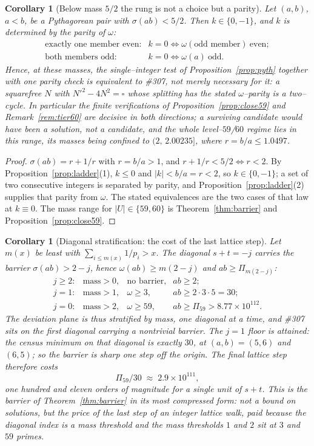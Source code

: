 \documentclass[11pt]{article}
\newtheorem{corollary}[theorem]{Corollary}
\theoremstyle{definition}
\begin{document}
\begin{corollary}[Below mass $5/2$ the rung is not a choice but a parity]\label{cor:kdetermined}
Let $(a,b)$, $a<b$, be a Pythagorean pair with $\sigma(ab)<5/2$. Then $k\in\{0,-1\}$, and $k$ is
\emph{determined} by the parity of $\omega$:
\[
\begin{array}{ll}
\text{exactly one member even:} & k=0\iff\omega(\text{odd member})\ \text{even};\\
\text{both members odd:}        & k=0\iff\omega(a)\ \text{odd}.
\end{array}
\]
Hence, at these masses, the single--integer test of Proposition~\ref{prop:pyth} together with one
parity check is \emph{equivalent} to \#307, not merely necessary for it: a squarefree $N$ with
$N'^2-4N^2=\square$ whose splitting has the stated $\omega$--parity \emph{is} a two--cycle. In
particular the finite verifications of Proposition~\ref{prop:close59} and Remark~\ref{rem:tier60} are
decisive in both directions; a surviving candidate would have been a solution, not a candidate,
and the whole level--$59$/$60$ regime lies in this range, its masses being confined to
$(2,\,2.00235]$, where $r=b/a\le1.0497$.
\end{corollary}
\begin{proof}
$\sigma(ab)=r+1/r$ with $r=b/a>1$, and $r+1/r<5/2\iff r<2$. By
Proposition~\ref{prop:ladder}(1), $k\le0$ and $|k|<b/a=r<2$, so $k\in\{0,-1\}$; a set of two
consecutive integers is separated by parity, and Proposition~\ref{prop:ladder}(2) supplies that
parity from $\omega$. The stated equivalences are the two cases of that law at $k\equiv0$. The
mass range for $|U|\in\{59,60\}$ is Theorem~\ref{thm:barrier} and Proposition~\ref{prop:close59}.
\end{proof}

\begin{corollary}[Diagonal stratification: the cost of the last lattice step]\label{cor:diagonals}
Let $m(x)$ be least with $\sum_{i\le m(x)}1/p_i>x$. The diagonal $s+t=-j$ carries the barrier
$\sigma(ab)>2-j$, hence $\omega(ab)\ge m(2-j)$ and $ab\ge\Pi_{m(2-j)}$:
\[
\begin{array}{llll}
j\ge2: & \text{mass}>0, & \text{no barrier}, & ab\ge2;\\
j=1:   & \text{mass}>1, & \omega\ge3,        & ab\ge2\cdot3\cdot5=30;\\
j=0:   & \text{mass}>2, & \omega\ge59,       & ab\ge\Pi_{59}>8.77\times10^{112}.
\end{array}
\]
The deviation plane is thus stratified by mass, one diagonal at a time, and \#307 sits on the first
diagonal carrying a nontrivial barrier. The $j=1$ floor is \emph{attained}: the census minimum on
that diagonal is exactly $30$, at $(a,b)=(5,6)$ and $(6,5)$; so the barrier is sharp one step off
the origin. The final lattice step therefore costs
\[ \Pi_{59}/30\;\approx\;2.9\times10^{111}, \]
one hundred and eleven orders of magnitude for a single unit of $s+t$. This is the barrier of
Theorem~\ref{thm:barrier} in its most compressed form: not a bound on solutions, but the price of
the last step of an integer lattice walk, paid because the diagonal index is a mass threshold and
the mass thresholds $1$ and $2$ sit at $3$ and $59$ primes.
\end{corollary}
\end{document}
